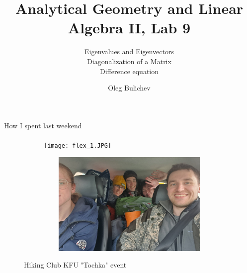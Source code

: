 \documentclass[aspectratio=169]{beamer}
\title[AGLA2]{Analytical Geometry and Linear Algebra II, Lab 9} %
\subtitle{Eigenvalues and Eigenvectors \\ Diagonalization of a Matrix \\ Difference equation
         } %
\author{Oleg Bulichev}
\newcommand{\fbckg}[1]{\usebackgroundtemplate{\texttt{[image: \#1]}}}%
\begin{document}
\setlength{\abovedisplayskip}{0pt}
\setlength{\belowdisplayskip}{0pt}
\setlength{\abovedisplayshortskip}{0pt}
\setlength{\belowdisplayshortskip}{0pt}

\fbckg{fibeamer/figs/title_page.png}

\fbckg{fibeamer/figs/common.png}

\begin{frame}[c]{How I spent last weekend}
    \framesubtitle{}
    \begin{figure}[H]
        \begin{subfigure}{0.49\textwidth}
            \centering\texttt{[image: flex\_1.JPG]}
        \end{subfigure}
        \hfill
        \begin{subfigure}{0.49\textwidth}
            \centering\includegraphics[height=5cm,width=1\textwidth,keepaspectratio]{flex_2.JPG}
        \end{subfigure}
        \caption*{\Large Hiking Club KFU "Tochka" event }
    \end{figure}
\end{frame}
\end{document}

